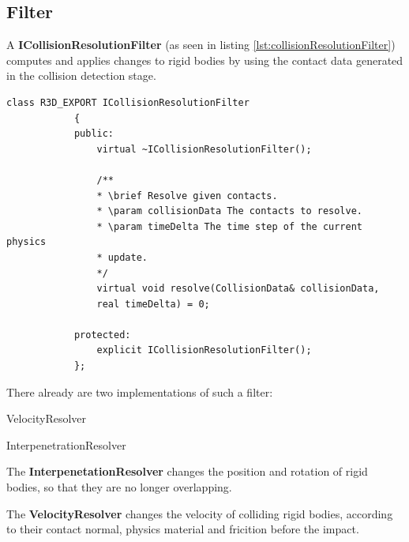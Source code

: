 \documentclass[12p, paper=a4, leqno, colorinlistoftodos]{article}
\newenvironment{packed_itemize}
{\begin{itemize}
		\setlength{\itemsep}{0pt}
		\setlength{\parskip}{0pt}
		\setlength{\parsep}{0pt}
	}{\end{itemize}}
\begin{document}
		\subsection{Filter}
		A \textbf{ICollisionResolutionFilter} (as seen in listing \ref{lst:collisionResolutionFilter}) computes and applies changes to rigid bodies by using the contact data generated in the collision detection stage. 
		\begin{lstlisting}[caption={Collision resolution filter},captionpos=b, label=lst:collisionResolutionFilter]
			class R3D_EXPORT ICollisionResolutionFilter
			{
			public:
				virtual ~ICollisionResolutionFilter();
				
				/**
				* \brief Resolve given contacts.
				* \param collisionData The contacts to resolve.
				* \param timeDelta The time step of the current physics
				* update.
				*/
				virtual void resolve(CollisionData& collisionData,
				real timeDelta) = 0;
				
			protected:
				explicit ICollisionResolutionFilter();
			};
		\end{lstlisting}
		There already are two implementations of such a filter:
		\begin{packed_itemize}
			\item VelocityResolver
			\item InterpenetrationResolver
		\end{packed_itemize}
		The \textbf{InterpenetationResolver} changes the position and rotation of rigid bodies, so that they are no longer overlapping.
		
		The \textbf{VelocityResolver} changes the velocity of colliding rigid bodies, according to their contact normal, physics material and fricition before the impact.
		
		
		
	
	
	
	
	
	
	
	
\end{document}
